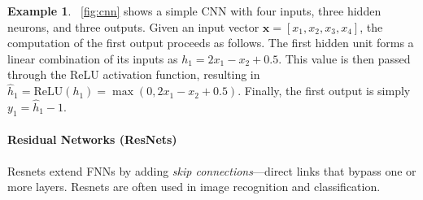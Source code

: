 \documentclass[oneside,11pt,dvipsnames]{book}
\numberwithin{equation}{section}
\theoremstyle{definition}
\newtheorem{example}{Example}[section]
\theoremstyle{remark}
\newcommand{\relu}[1]{\mathrm{ReLU}\left(#1\right)}
\begin{document}
\begin{example}
   ~\autoref{fig:cnn} shows a simple CNN with four inputs, three hidden neurons, and three outputs. %
Given an input vector $\mathbf{x} = [x_1, x_2, x_3, x_4]$, the computation of the first output proceeds as follows.
The first hidden unit forms a linear combination of its inputs as $h_1 = 2x_1 - x_2 + 0.5$.
This value is then passed through the ReLU activation function, resulting in $\hat{h}_1 = \relu{h_1} = \max(0, 2x_1 - x_2 + 0.5)$.
Finally, the first output is simply $y_1 = \hat{h}_1 - 1$.

\end{example}

\paragraph{Residual Networks (ResNets)} Resnets extend FNNs by adding \emph{skip connections}—direct links that bypass one or more layers. Resnets are often used in image recognition and classification.
\end{document}
